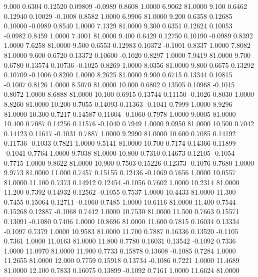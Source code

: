    9.000   0.6304   0.12520   0.09809  -0.0989   0.8608   1.0000   6.9062  81.0000
   9.100   0.6462   0.12940   0.10029  -0.1008   0.8582   1.0000   6.9906  81.0000
   9.200   0.6358   0.12685   0.10000  -0.0989   0.8540   1.0000   7.1329  81.0000
   9.300   0.6351   0.12624   0.10053  -0.0982   0.8459   1.0000   7.4001  81.0000
   9.400   0.6429   0.12750   0.10190  -0.0989   0.8392   1.0000   7.6258  81.0000
   9.500   0.6553   0.12983   0.10372  -0.1001   0.8337   1.0000   7.8082  81.0000
   9.600   0.6720   0.13372   0.10600  -0.1020   0.8297   1.0000   7.9419  81.0000
   9.700   0.6780   0.13574   0.10736  -0.1025   0.8269   1.0000   8.0356  81.0000
   9.800   0.6675   0.13292   0.10709  -0.1006   0.8200   1.0000   8.2625  81.0000
   9.900   0.6715   0.13344   0.10815  -0.1007   0.8126   1.0000   8.5070  81.0000
  10.000   0.6802   0.13505   0.10968  -0.1015   0.8072   1.0000   8.6888  81.0000
  10.100   0.6915   0.13744   0.11150  -0.1026   0.8030   1.0000   8.8260  81.0000
  10.200   0.7055   0.14093   0.11363  -0.1041   0.7999   1.0000   8.9296  81.0000
  10.300   0.7217   0.14587   0.11604  -0.1060   0.7978   1.0000   9.0005  81.0000
  10.400   0.7087   0.14256   0.11576  -0.1040   0.7949   1.0000   9.0950  81.0000
  10.500   0.7042   0.14123   0.11617  -0.1031   0.7887   1.0000   9.2990  81.0000
  10.600   0.7085   0.14192   0.11736  -0.1033   0.7821   1.0000   9.5141  81.0000
  10.700   0.7174   0.14366   0.11899  -0.1041   0.7764   1.0000   9.7038  81.0000
  10.800   0.7310   0.14673   0.12105  -0.1054   0.7715   1.0000   9.8622  81.0000
  10.900   0.7503   0.15226   0.12373  -0.1076   0.7680   1.0000   9.9773  81.0000
  11.000   0.7457   0.15155   0.12436  -0.1069   0.7656   1.0000  10.0557  81.0000
  11.100   0.7373   0.14912   0.12454  -0.1056   0.7602   1.0000  10.2314  81.0000
  11.200   0.7392   0.14932   0.12562  -0.1055   0.7537   1.0000  10.4433  81.0000
  11.300   0.7455   0.15064   0.12711  -0.1060   0.7485   1.0000  10.6116  81.0000
  11.400   0.7544   0.15268   0.12887  -0.1068   0.7442   1.0000  10.7530  81.0000
  11.500   0.7663   0.15571   0.13091  -0.1080   0.7406   1.0000  10.8696  81.0000
  11.600   0.7815   0.16034   0.13334  -0.1097   0.7379   1.0000  10.9583  81.0000
  11.700   0.7887   0.16336   0.13520  -0.1105   0.7361   1.0000  11.0163  81.0000
  11.800   0.7780   0.16031   0.13542  -0.1092   0.7336   1.0000  11.0970  81.0000
  11.900   0.7733   0.15878   0.13608  -0.1085   0.7284   1.0000  11.2655  81.0000
  12.000   0.7759   0.15918   0.13734  -0.1086   0.7221   1.0000  11.4689  81.0000
  12.100   0.7833   0.16075   0.13899  -0.1092   0.7161   1.0000  11.6624  81.0000
